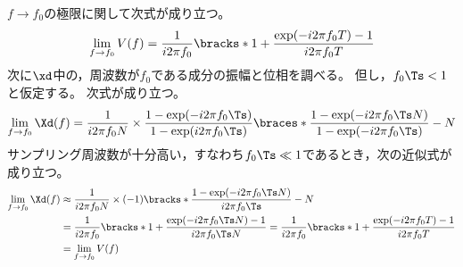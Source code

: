             $f\to f_0$の極限に関して次式が成り立つ。
            \[ \lim_{f\to f_0} V(f) = \frac{1}{i2\pi f_0}\bracks*{1 + \frac{\exp(-i 2\pi f_0 T)-1}{i 2\pi f_0 T}} \]
            次に$\xd$中の，周波数が$f_0$である成分の振幅と位相を調べる。
            但し，$f_0\Ts < 1$と仮定する。
            次式が成り立つ。
            \[ \lim_{f\to f_0} \Xd(f) = \frac{1}{i 2\pi f_0 N}\times\frac{1-\exp(-i 2\pi f_0\Ts)}{1-\exp(i 2\pi f_0\Ts)}\braces*{\frac{1-\exp(-i 2\pi f_0 \Ts N)}{1-\exp(-i 2\pi f_0 \Ts)} - N} \]
            サンプリング周波数が十分高い，すなわち$f_0\Ts\ll 1$であるとき，次の近似式が成り立つ。
            \begin{align*}
                \lim_{f\to f_0} \Xd(f) &\approx \frac{1}{i 2\pi f_0 N}\times(-1)\bracks*{\frac{1-\exp(-i 2\pi f_0 \Ts N)}{i 2\pi f_0 \Ts} - N} \\
                &= \frac{1}{i 2\pi f_0}\bracks*{1 + \frac{\exp(-i 2\pi f_0 \Ts N)-1}{i 2\pi f_0 \Ts N}} = \frac{1}{i 2\pi f_0}\bracks*{1 + \frac{\exp(-i 2\pi f_0 T)-1}{i 2\pi f_0 T}} \\
                &=  \lim_{f\to f_0} V(f)
            \end{align*}
